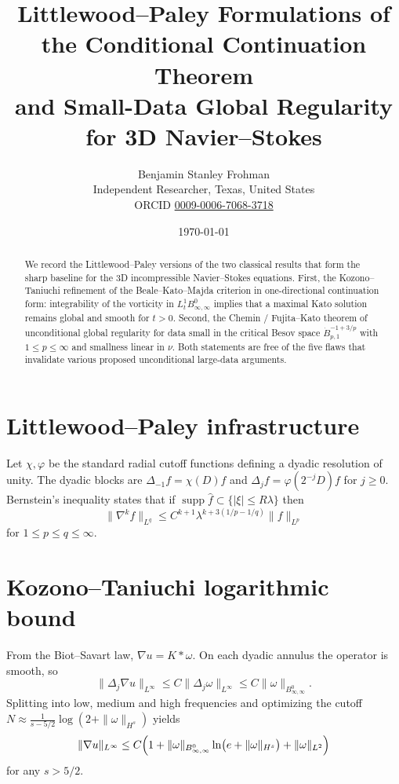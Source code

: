 \documentclass[11pt,a4paper]{article}
\title{Littlewood--Paley Formulations of the Conditional Continuation Theorem\\and Small-Data Global Regularity for 3D Navier--Stokes}
\author{Benjamin Stanley Frohman\\
\small Independent Researcher, Texas, United States\\
\small ORCID \href{https://orcid.org/0009-0006-7068-3718}{0009-0006-7068-3718}}
\date{\today}
\begin{document}
\maketitle
{}\par\medskip

\begin{abstract}
We record the Littlewood--Paley versions of the two classical results that form the sharp baseline for the 3D incompressible Navier--Stokes equations. First, the Kozono--Taniuchi refinement of the Beale--Kato--Majda criterion in one-directional continuation form: integrability of the vorticity in \(L^1_t B^0_{\infty,\infty}\) implies that a maximal Kato solution remains global and smooth for \(t>0\). Second, the Chemin / Fujita--Kato theorem of unconditional global regularity for data small in the critical Besov space \(\dot{B}^{-1+3/p}_{p,1}\) with \(1\le p\le\infty\) and smallness linear in \(\nu\). Both statements are free of the five flaws that invalidate various proposed unconditional large-data arguments.
\end{abstract}

\section{Littlewood--Paley infrastructure}

Let \(\chi,\varphi\) be the standard radial cutoff functions defining a dyadic resolution of unity. The dyadic blocks are \(\Delta_{-1}f=\chi(D)f\) and \(\Delta_j f=\varphi(2^{-j}D)f\) for \(j\ge 0\). Bernstein's inequality states that if \(\operatorname{supp}\widehat{f}\subset\{|\xi|\le R\lambda\}\) then
\[
\|\nabla^k f\|_{L^q}\le C^{k+1}\lambda^{k+3(1/p-1/q)}\|f\|_{L^p}
\]
for \(1\le p\le q\le\infty\).

\section{Kozono--Taniuchi logarithmic bound}

From the Biot--Savart law, \(\nabla u=K*\omega\). On each dyadic annulus the operator is smooth, so
\[
\|\Delta_j\nabla u\|_{L^\infty}\le C\|\Delta_j\omega\|_{L^\infty}\le C\|\omega\|_{B^0_{\infty,\infty}}.
\]
Splitting into low, medium and high frequencies and optimizing the cutoff \(N\approx\frac1{s-5/2}\log(2+\|\omega\|_{H^s})\) yields
\begin{equation}\label{eq:KT}
\|\nabla u\|_{L^\infty}
\le C\Bigl(1+\|\omega\|_{B^0_{\infty,\infty}}\ln\bigl(e+\|\omega\|_{H^s}\bigr)+\|\omega\|_{L^2}\Bigr)
\end{equation}
for any \(s>5/2\).
\end{document}
